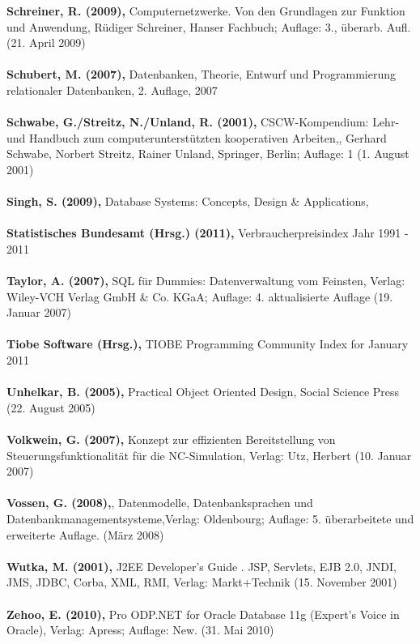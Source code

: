 \textbf{Schreiner, R. (2009),} Computernetzwerke. Von den Grundlagen zur Funktion und Anwendung, Rüdiger Schreiner, Hanser Fachbuch; Auflage: 3., überarb. Aufl. (21. April 2009)\\\\
\textbf{Schubert, M. (2007),} Datenbanken, Theorie, Entwurf und Programmierung relationaler Datenbanken, 2. Auflage, 2007\\\\
\textbf{Schwabe, G./Streitz, N./Unland, R. (2001),} CSCW-Kompendium: Lehr- und Handbuch zum computerunterstützten kooperativen Arbeiten,, Gerhard Schwabe, Norbert Streitz, Rainer Unland, Springer, Berlin; Auflage: 1 (1. August 2001)\\\\
\textbf{Singh, S. (2009),} Database Systems: Concepts, Design \& Applications,\\\\
\textbf{Statistisches Bundesamt (Hrsg.) (2011),} Verbraucherpreisindex Jahr 1991 - 2011\\\\
\textbf{Taylor, A. (2007),} SQL für Dummies: Datenverwaltung vom Feinsten, Verlag: Wiley-VCH Verlag GmbH \& Co. KGaA; Auflage: 4. aktualisierte Auflage (19. Januar 2007)\\\\
\textbf{Tiobe Software (Hrsg.),} TIOBE Programming Community Index for January 2011\\\\
\textbf{Unhelkar, B. (2005),} Practical Object Oriented Design, Social Science Press (22. August 2005)\\\\
\textbf{Volkwein, G. (2007),} Konzept zur effizienten Bereitstellung von Steuerungsfunktionalität für die NC-Simulation, Verlag: Utz, Herbert (10. Januar 2007)\\\\
\textbf{Vossen, G. (2008),}, Datenmodelle, Datenbanksprachen und Datenbankmanagementsysteme,Verlag: Oldenbourg; Auflage: 5. überarbeitete und erweiterte Auflage. (März 2008)\\\\
\textbf{Wutka, M. (2001),} J2EE Developer's Guide . JSP, Servlets, EJB 2.0, JNDI, JMS, JDBC, Corba, XML, RMI, Verlag: Markt+Technik (15. November 2001)\\\\
\textbf{Zehoo, E. (2010),} Pro ODP.NET for Oracle Database 11g (Expert's Voice in Oracle), Verlag: Apress; Auflage: New. (31. Mai 2010)\\\\

